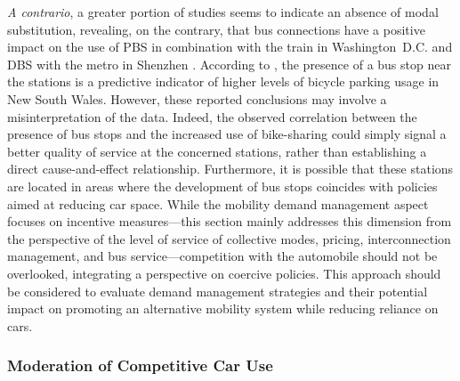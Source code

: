 \begin{refsegment}
\textsl{A contrario}, a greater portion of studies seems to indicate an absence of modal substitution, revealing, on the contrary, that bus connections have a positive impact on the use of \acrshort{PBS} in combination with the train in Washington~D.C. \textcolor{blue}{\autocite[7-8]{ma_bicycle_2015}} and \acrshort{DBS} with the metro in Shenzhen \textcolor{blue}{\autocite[12]{guo_built_2020}}. According to \textcolor{blue}{\textcite[20]{arbis_analysis_2016}}, the presence of a bus stop near the stations is a predictive indicator of higher levels of bicycle parking usage in New South Wales. However, these reported conclusions may involve a misinterpretation of the data. Indeed, the observed correlation between the presence of bus stops and the increased use of bike-sharing could simply signal a better quality of service at the concerned stations, rather than establishing a direct cause-and-effect relationship. Furthermore, it is possible that these stations are located in areas where the development of bus stops coincides with policies aimed at reducing car space. While the mobility demand management aspect focuses on incentive measures—this section mainly addresses this dimension from the perspective of the level of service of collective modes, pricing, interconnection management, and bus service—competition with the automobile should not be overlooked, integrating a perspective on coercive policies. This approach should be considered to evaluate demand management strategies and their potential impact on promoting an alternative mobility system while reducing reliance on cars.%

\subsubsection*{Moderation of Competitive Car Use
    \label{chap2:moderation-automobile}
    }


\end{refsegment}
